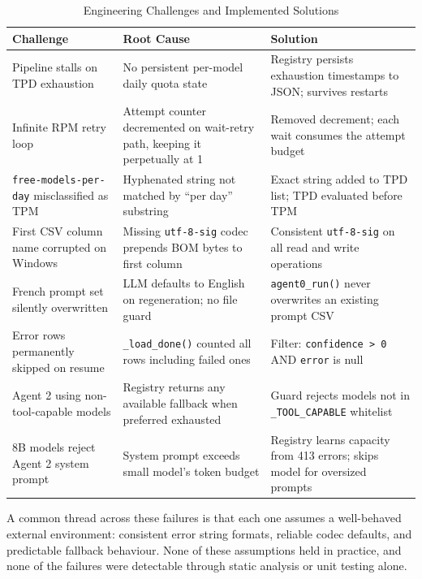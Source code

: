 \begin{table}[H]
\centering
\caption{Engineering Challenges and Implemented Solutions}
\label{tab:challenges}
\begin{tabular}{|p{3.6cm}|p{4.6cm}|p{4.6cm}|}
\hline
\textbf{Challenge} & \textbf{Root Cause} & \textbf{Solution} \\
\hline
Pipeline stalls on TPD exhaustion & No persistent per-model daily quota state & Registry persists exhaustion timestamps to JSON; survives restarts \\
\hline
Infinite RPM retry loop & Attempt counter decremented on wait-retry path, keeping it perpetually at 1 & Removed decrement; each wait consumes the attempt budget \\
\hline
\texttt{free-models-per-day} misclassified as TPM & Hyphenated string not matched by ``per day'' substring & Exact string added to TPD list; TPD evaluated before TPM \\
\hline
First CSV column name corrupted on Windows & Missing \texttt{utf-8-sig} codec prepends BOM bytes to first column & Consistent \texttt{utf-8-sig} on all read and write operations \\
\hline
French prompt set silently overwritten & LLM defaults to English on regeneration; no file guard & \texttt{agent0\_run()} never overwrites an existing prompt CSV \\
\hline
Error rows permanently skipped on resume & \texttt{\_load\_done()} counted all rows including failed ones & Filter: \texttt{confidence > 0} AND \texttt{error} is null \\
\hline
Agent 2 using non-tool-capable models & Registry returns any available fallback when preferred exhausted & Guard rejects models not in \texttt{\_TOOL\_CAPABLE} whitelist \\
\hline
8B models reject Agent 2 system prompt & System prompt exceeds small model's token budget & Registry learns capacity from 413 errors; skips model for oversized prompts \\
\hline
\end{tabular}
\end{table}

A common thread across these failures is that each one assumes a well-behaved external
environment: consistent error string formats, reliable codec defaults, and predictable
fallback behaviour. None of these assumptions held in practice, and none of the failures
were detectable through static analysis or unit testing alone.

